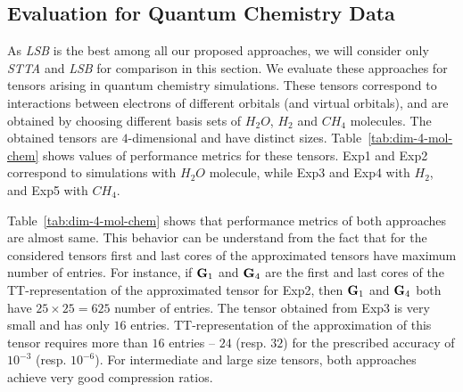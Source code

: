 \documentclass[runningheads]{llncs}
\newcommand{\tensor}[1]{{\cal\textbf{#1}\xspace}}
\newcommand{\hthird}{{\it LSB}\xspace}
\newcommand{\otta}{{\it STTA}\xspace}
\begin{document}
\subsection{Evaluation for Quantum Chemistry Data}
As \hthird is the best among all our proposed approaches, we will consider only \otta and \hthird for comparison in this section. We evaluate these approaches for tensors arising in quantum chemistry simulations. These tensors correspond to interactions between electrons of different orbitals (and virtual orbitals), and are obtained by choosing different basis sets of $H_2O$, $H_2$ and $CH_4$ molecules. The obtained tensors are $4$-dimensional and have distinct sizes. Table~\ref{tab:dim-4-mol-chem} shows values of performance metrics for these tensors. Exp1 and Exp2 correspond to simulations with $H_2O$ molecule, while Exp3 and Exp4 with $H_2$, and Exp5 with $CH_4$. 



Table~\ref{tab:dim-4-mol-chem} shows that performance metrics of both approaches are almost same. This behavior can be understand from the fact that for the considered tensors first and last cores of the approximated tensors have maximum number of entries. For instance, if $\tensor{G}_1$ and $\tensor{G}_4$ are the first and last cores of the TT-representation of the approximated tensor for Exp2, then $\tensor{G}_1$ and $\tensor{G}_4$ both have $25\times25=625$ number of entries. The tensor obtained from Exp3 is very small and has only $16$ entries. TT-representation of the approximation of this tensor requires more than $16$ entries -- $24$ (resp. $32$) for the prescribed accuracy of $10^{-3}$ (resp. $10^{-6}$). For intermediate and large size tensors, both approaches achieve very good compression ratios.
\end{document}

